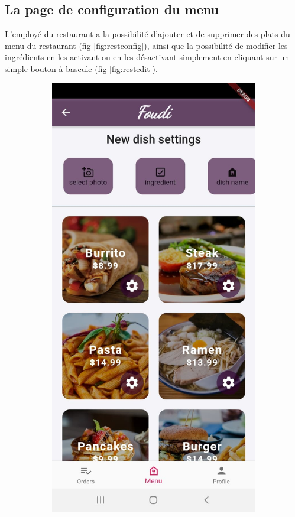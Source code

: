 \documentclass[french, a4paper, 12pt]{report}
\begin{document}
		\subsection{La page de configuration du menu} L'employé du restaurant a la possibilité d'ajouter et de supprimer des plats du menu du restaurant (fig \ref{fig:restconfig}), ainsi que la possibilité de modifier les ingrédients en les activant ou en les désactivant simplement en cliquant sur un simple bouton à bascule (fig \ref{fig:restedit}).
		
		\newpage

\begin{figure}[h!]
\centering
\begin{subfigure}{.5\textwidth}
  \centering
  \includegraphics[width=.9\linewidth]{screenshots/Restaurantviews/MenuSetup.jpg}

\end{subfigure}
\end{figure}
\end{document}

